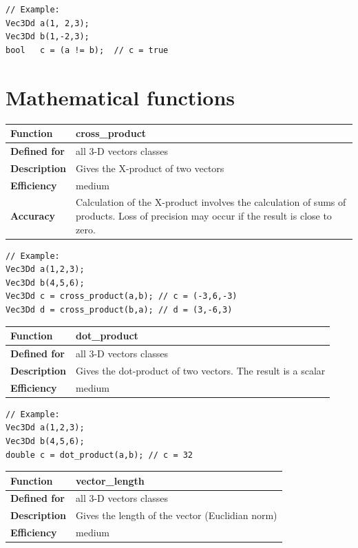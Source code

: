 \documentclass[11pt,a4paper,oneside,openright]{report}
\newcommand{\vspacesmall}{\vspace{3mm}}
\newcommand{\vspacebig}{\vspace{6mm}}
\begin{document}
\begin{lstlisting}[frame=none]
// Example:
Vec3Dd a(1, 2,3);
Vec3Dd b(1,-2,3);
bool   c = (a != b);  // c = true
\end{lstlisting}
\vspacebig


\chapter{Mathematical functions}\label{chap:MathematicalFunctions}


\begin{tabular}{|p{25mm}|p{100mm}|}
\hline
\bfseries Function & cross\_product \\ \hline
\bfseries Defined for & all 3-D vectors classes  \\ \hline
\bfseries Description & Gives the X-product of two vectors \\ \hline
\bfseries Efficiency & medium \\ \hline
\bfseries Accuracy & Calculation of the X-product involves the calculation of sums of products. Loss of precision may occur if the result is close to zero. \\ \hline
\end{tabular}
\vspacesmall

\begin{lstlisting}[frame=none]
// Example:
Vec3Dd a(1,2,3);
Vec3Dd b(4,5,6);
Vec3Dd c = cross_product(a,b); // c = (-3,6,-3)
Vec3Dd d = cross_product(b,a); // d = (3,-6,3)
\end{lstlisting}
\vspacebig


\begin{tabular}{|p{25mm}|p{100mm}|}
\hline
\bfseries Function & dot\_product \\ \hline
\bfseries Defined for & all 3-D vectors classes  \\ \hline
\bfseries Description & Gives the dot-product of two vectors. The result is a scalar \\ \hline
\bfseries Efficiency & medium \\ \hline
\end{tabular}
\vspacesmall

\begin{lstlisting}[frame=none]
// Example:
Vec3Dd a(1,2,3);
Vec3Dd b(4,5,6);
double c = dot_product(a,b); // c = 32
\end{lstlisting}
\vspacebig


\begin{tabular}{|p{25mm}|p{100mm}|}
\hline
\bfseries Function & vector\_length \\ \hline
\bfseries Defined for & all 3-D vectors classes  \\ \hline
\bfseries Description & Gives the length of the vector (Euclidian norm) \\ \hline
\bfseries Efficiency & medium \\ \hline
\end{tabular}
\vspacesmall
\end{document}
